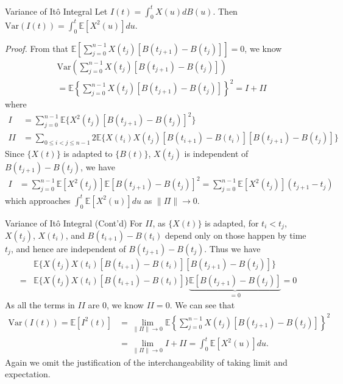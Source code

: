 \documentclass[letterpaper,handout]{beamer}
\def\Sum{\sum\nolimits}
\def\E{\mathbb E}
\def\V{\mathrm{Var}}
\begin{document}
\begin{frame}{Variance of It\^{o} Integral}
Let $I(t)=\int_0^t X(u)d B(u)$. Then $\V(I(t))=\int_0^t \E[X^2(u)]du$.

{\em Proof.}
From that $\E[\sum_{j=0}^{n-1}X(t_j)[B(t_{j+1})-B(t_j)]]=0$, we know
\begin{align*}
&\V\left(\Sum_{j=0}^{n-1}X(t_j)[B(t_{j+1})-B(t_j)]\right)\\[-3pt]
&=\E\left\{\Sum_{j=0}^{n-1}X(t_j)[B(t_{j+1})-B(t_j)]\right\}^2=I+II
\end{align*}
where
\begin{align*}
I&=\Sum_{j=0}^{n-1}\E\{X^2(t_j)[B(t_{j+1})-B(t_j)]^2\}\\[-3pt]
II&=\Sum_{0\le i<j\le n-1}2\E\{X(t_i)X(t_j)[B(t_{i+1})-B(t_i)][B(t_{j+1})-B(t_j)]\}
\end{align*}
Since $\{X(t)\}$ is adapted to $\{B(t)\}$, $X(t_j)$ is independent of $B(t_{j+1})-B(t_j)$, we have
\begin{align*}
I&=\sum_{j=0}^{n-1}\E[X^2(t_j)]\E[B(t_{j+1})-B(t_j)]^2=\sum_{j=0}^{n-1}\E[X^2(t_j)](t_{j+1}-t_j)
\end{align*}
which approaches $\int_0^t\E[X^2(u)]du$ as $\|\Pi\|\to 0$.
\end{frame}
\begin{frame}{Variance of It\^{o} Integral (Cont'd)}
For $II$, as $\{X(t)\}$ is adapted, for $t_i<t_j$,
$X(t_j)$, $X(t_i)$, and $B(t_{i+1})-B(t_i)$ depend only on those happen by time $t_j$, and hence are independent of
$B(t_{j+1})-B(t_j)$. Thus we have
\begin{align*}
&\E\{X(t_j)X(t_i)[B(t_{i+1})-B(t_i)][B(t_{j+1})-B(t_j)]\}\\
={}&\E\{X(t_j)X(t_i)[B(t_{i+1})-B(t_i)]\}\underbrace{\E[B(t_{j+1})-B(t_j)]}_{=0}=0
\end{align*}
As all the terms in $II$ are 0, we know $II = 0.$
We can see that
\begin{align*}
\V(I(t))=\E[I^2(t)]&=\lim_{\|\Pi\|\to 0}\E\left\{\Sum_{j=0}^{n-1}X(t_j)[B(t_{j+1})-B(t_j)]\right\}^2\\
&=\lim_{\|\Pi\|\to 0}I+II=\int_0^t\E[X^2(u)]du.
\end{align*}
Again we omit the justification of the interchangeability of taking limit and expectation.
\end{frame}
\end{document}
